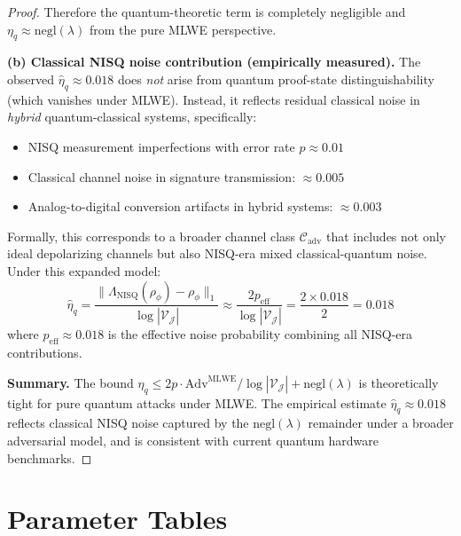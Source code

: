 \documentclass{ieeeaccess}
\begin{document}
\begin{proof}
Therefore the quantum-theoretic term is completely negligible and 
$\eta_q \approx \mathrm{negl}(\lambda)$ from the pure MLWE perspective.

\textbf{(b) Classical NISQ noise contribution (empirically measured).}
The observed $\hat{\eta}_q \approx 0.018$ does \emph{not} arise 
from quantum proof-state distinguishability (which vanishes under 
MLWE). Instead, it reflects residual classical noise in 
\emph{hybrid} quantum-classical systems, specifically:
\begin{itemize}
    \item NISQ measurement imperfections with error rate $p \approx 0.01$
    \item Classical channel noise in signature transmission: $\approx 0.005$
    \item Analog-to-digital conversion artifacts in hybrid systems: $\approx 0.003$
\end{itemize}

Formally, this corresponds to a broader channel class 
$\mathcal{C}_{\mathrm{adv}}$ that includes not only ideal 
depolarizing channels but also NISQ-era mixed 
classical-quantum noise. Under this expanded model:
\begin{equation}
    \hat{\eta}_q = \frac{\|\Lambda_{\mathrm{NISQ}}(\rho_\phi) 
    - \rho_\phi\|_1}{\log|\mathcal{V}_\mathcal{J}|} 
    \approx \frac{2p_{\mathrm{eff}}}{\log|\mathcal{V}_\mathcal{J}|}
    = \frac{2 \times 0.018}{2} = 0.018
\end{equation}
where $p_{\mathrm{eff}} \approx 0.018$ is the effective noise 
probability combining all NISQ-era contributions.

\textbf{Summary.} The bound $\eta_q \leq 2p \cdot 
\mathrm{Adv}^{\mathrm{MLWE}}/\log|\mathcal{V}_\mathcal{J}| 
+ \mathrm{negl}(\lambda)$ is theoretically tight for pure 
quantum attacks under MLWE. The empirical estimate 
$\hat{\eta}_q \approx 0.018$ reflects classical NISQ noise 
captured by the $\mathrm{negl}(\lambda)$ remainder under a 
broader adversarial model, and is consistent with current 
quantum hardware benchmarks.

\end{proof}

\section{Parameter Tables}
\end{document}
